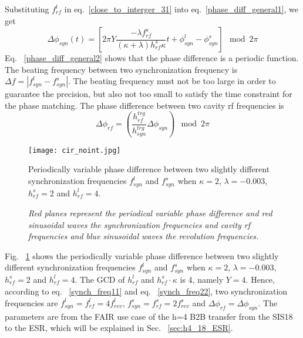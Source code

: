 Substituting $f_{\mathit{rf}}^{l}$ in eq.~\ref{close_to_interger_31} into eq.~\ref{phase_diff_general1}, we get 
\begin{equation}
	\Delta \phi_\mathit{syn}(t)=[2\pi Y\frac{-{\lambda f_{\mathit{rf}}^{s}}}{(\kappa+\lambda)h^s_\mathit{rf}\kappa}t+\phi_\mathit{syn}^l-\phi^s_\mathit{syn}] \mod 2\pi \label{phase_diff_general2}
\end{equation}
Eq. ~\ref{phase_diff_general2} shows that the phase difference is a periodic function. The beating frequency between two synchronization frequency is $\Delta f=|f_{\mathit{syn}}^{l}-f_{\mathit{syn}}^{s}|$. The beating frequency must not be too large in order to guarantee the precision, but also not too small to satisfy the time constraint for the phase matching. The phase difference between two cavity rf frequencies is
\begin{equation}
\Delta \phi_\mathit{rf}=(\frac{h_{\mathit{rf}}^{trg}}{h_{\mathit{syn}}^{trg}}\Delta \phi_\mathit{syn}) \mod 2\pi 
\end{equation}
\begin{figure}[H]
   \centering   
   \texttt{[image: cir\_noint.jpg]}
   \caption{Periodically variable phase difference between two slightly different synchronization frequencies $f_{\mathit{syn}}^{l}$ and $f_{\mathit{syn}}^{s}$ when $\kappa=2$, $\lambda=-0.003$, $h^s_\mathit{rf}=2$ and $h^l_\mathit{rf}=4$.}
	\caption*{\textsl{\small{Red planes represent the periodical variable phase difference and red sinusoidal waves the synchronization frequencies and cavity rf frequencies and blue sinusoidal waves the revolution frequencies.}}}
   \label{cir_noint}
\end{figure} 

Fig. ~\ref{cir_noint} shows the periodically variable phase difference between two slightly different synchronization frequencies $f_{\mathit{syn}}^{l}$ and $f_{\mathit{syn}}^{s}$ when $\kappa=2$, $\lambda=-0.003$, $h^s_\mathit{rf}=2$ and $h^l_\mathit{rf}=4$. The GCD of $h^l_\mathit{rf}$ and $h^s_\mathit{rf} \cdot \kappa$ is 4, namely $Y=4$. Hence, according to eq. ~\ref{synch_freq11} and eq. ~\ref{synch_freq22}, two synchronization frequencies are $f_{\mathit{syn}}^{l}=f_{\mathit{rf}}^{l}=4f_{\mathit{rev}}^{l}$, $f_{\mathit{syn}}^{s}=f_{\mathit{rf}}^{s}=2f_{\mathit{rev}}^{s}$ and $\Delta \phi_\mathit{rf}=\Delta \phi_\mathit{syn}$.  The parameters are from the FAIR use case of the h=4 B2B transfer from the SIS18 to the ESR, which will be explained in Sec. ~\ref{sec:h4_18_ESR}. 

